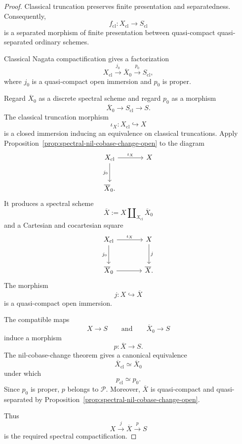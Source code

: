 \begin{proof}
Classical truncation preserves finite presentation and separatedness.
Consequently,
\[
    f_{\mathrm{cl}}:
    X_{\mathrm{cl}}
    \longrightarrow
    S_{\mathrm{cl}}
\]
is a separated morphism of finite presentation between quasi-compact
quasi-separated ordinary schemes.

Classical Nagata compactification gives a factorization
\[
    X_{\mathrm{cl}}
    \xrightarrow{j_0}
    \overline X_0
    \xrightarrow{p_0}
    S_{\mathrm{cl}},
\]
where \(j_0\) is a quasi-compact open immersion and \(p_0\) is proper.

Regard \(\overline X_0\) as a discrete spectral scheme and regard \(p_0\)
as a morphism
\[
    \overline X_0
    \longrightarrow
    S_{\mathrm{cl}}
    \longrightarrow
    S.
\]
The classical truncation morphism
\[
    \iota_X:
    X_{\mathrm{cl}}
    \hookrightarrow
    X
\]
is a closed immersion inducing an equivalence on classical truncations.
Apply
Proposition~\ref{prop:spectral-nil-cobase-change-open}
to the diagram
\[
\begin{tikzcd}[column sep=large,row sep=large]
    X_{\mathrm{cl}}
        \arrow[r,"\iota_X"]
        \arrow[d,"j_0"']
        & X \\
    \overline X_0.
\end{tikzcd}
\]
It produces a spectral scheme
\[
    \overline X
    :=
    X\amalg_{X_{\mathrm{cl}}}\overline X_0
\]
and a Cartesian and cocartesian square
\[
\begin{tikzcd}[column sep=large,row sep=large]
    X_{\mathrm{cl}}
        \arrow[r,"\iota_X"]
        \arrow[d,"j_0"']
        & X \arrow[d,"j"] \\
    \overline X_0
        \arrow[r]
        & \overline X.
\end{tikzcd}
\]
The morphism
\[
    j:X\hookrightarrow\overline X
\]
is a quasi-compact open immersion.

The compatible maps
\[
    X\longrightarrow S
    \qquad\text{and}\qquad
    \overline X_0\longrightarrow S
\]
induce a morphism
\[
    p:\overline X\longrightarrow S.
\]
The nil-cobase-change theorem gives a canonical equivalence
\[
    \overline X_{\mathrm{cl}}
    \simeq
    \overline X_0
\]
under which
\[
    p_{\mathrm{cl}}
    \simeq
    p_0.
\]
Since \(p_0\) is proper, \(p\) belongs to \(\mathcal P\).  Moreover,
\(\overline X\) is quasi-compact and quasi-separated by
Proposition~\ref{prop:spectral-nil-cobase-change-open}.

Thus
\[
    X
    \xrightarrow{j}
    \overline X
    \xrightarrow{p}
    S
\]
is the required spectral compactification.
\end{proof}

